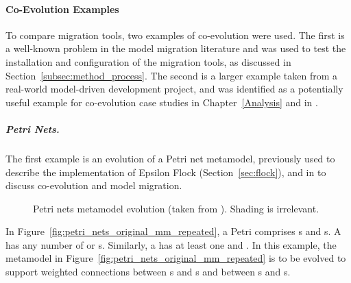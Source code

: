 \paragraph{Co-Evolution Examples}
\label{subsec:method_examples}
To compare migration tools, two examples of co-evolution were used. The first is a well-known problem in the model migration literature and was used to test the installation and configuration of the migration tools, as discussed in Section~\ref{subsec:method_process}. The second is a larger example taken from a real-world model-driven development project, and was identified as a potentially useful example for co-evolution case studies in Chapter~\ref{Analysis} and in \cite{herrmannsdoerfer09gmf}.

\subparagraph{Petri Nets.}
The first example is an evolution of a Petri net metamodel, previously used to describe the implementation of Epsilon Flock (Section~\ref{sec:flock}), and in \cite{cicchetti08automating,garces09managing,rose10flock,wachsmuth07metamodel} to discuss co-evolution and model migration.

\begin{figure}[htbp]
	\centering
	\caption{Petri nets metamodel evolution (taken from \cite{rose10flock}). Shading is irrelevant.}
\label{fig:petri_nets_mms_repeated}
\end{figure}

In Figure~\ref{fig:petri_nets_original_mm_repeated}, a Petri  comprises s and s. A  has any number of  or  s. Similarly, a  has at least one  and  . In this example, the metamodel in Figure~\ref{fig:petri_nets_original_mm_repeated} is to be evolved to support weighted connections between s and s and between s and s.

